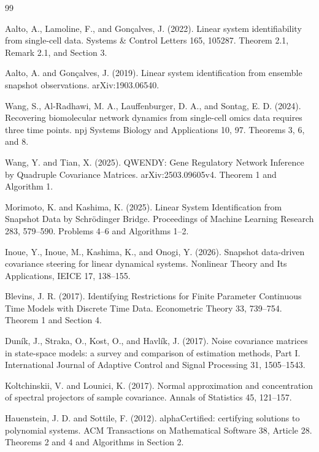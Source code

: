 \documentclass{article}
\begin{document}
\begin{thebibliography}{99}

   Aalto, A., Lamoline, F., and Gonçalves, J. (2022). Linear system identifiability from single-cell data. Systems \& Control Letters 165, 105287. Theorem 2.1, Remark 2.1, and Section 3.

   Aalto, A. and Gonçalves, J. (2019). Linear system identification from ensemble snapshot observations. arXiv:1903.06540.

   Wang, S., Al-Radhawi, M. A., Lauffenburger, D. A., and Sontag, E. D. (2024). Recovering biomolecular network dynamics from single-cell omics data requires three time points. npj Systems Biology and Applications 10, 97. Theorems 3, 6, and 8.

   Wang, Y. and Tian, X. (2025). QWENDY: Gene Regulatory Network Inference by Quadruple Covariance Matrices. arXiv:2503.09605v4. Theorem 1 and Algorithm 1.

   Morimoto, K. and Kashima, K. (2025). Linear System Identification from Snapshot Data by Schrödinger Bridge. Proceedings of Machine Learning Research 283, 579--590. Problems 4--6 and Algorithms 1--2.

   Inoue, Y., Inoue, M., Kashima, K., and Onogi, Y. (2026). Snapshot data-driven covariance steering for linear dynamical systems. Nonlinear Theory and Its Applications, IEICE 17, 138--155.

   Blevins, J. R. (2017). Identifying Restrictions for Finite Parameter Continuous Time Models with Discrete Time Data. Econometric Theory 33, 739--754. Theorem 1 and Section 4.

   Duník, J., Straka, O., Kost, O., and Havlík, J. (2017). Noise covariance matrices in state-space models: a survey and comparison of estimation methods, Part I. International Journal of Adaptive Control and Signal Processing 31, 1505--1543.

   Koltchinskii, V. and Lounici, K. (2017). Normal approximation and concentration of spectral projectors of sample covariance. Annals of Statistics 45, 121--157.

   Hauenstein, J. D. and Sottile, F. (2012). alphaCertified: certifying solutions to polynomial systems. ACM Transactions on Mathematical Software 38, Article 28. Theorems 2 and 4 and Algorithms in Section 2.


\end{thebibliography}
\end{document}
